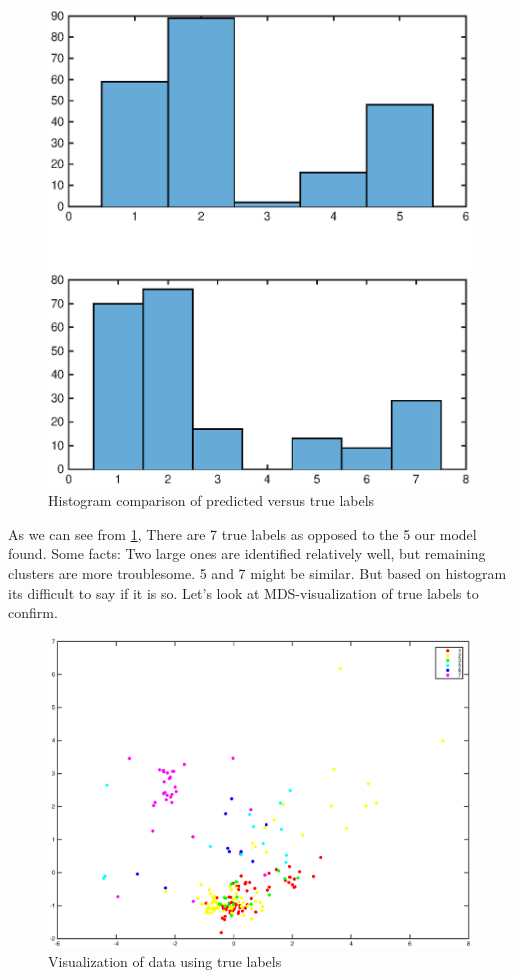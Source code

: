 \documentclass[a4paper]{article}
\begin{document}
\begin{figure}[H]
	\includegraphics[scale=0.67]{histogram_comparison.eps}
	\caption{Histogram comparison of predicted versus true labels}
	\label{histogram_comparison}
\end{figure}

\par
As we can see from \ref{histogram_comparison},  There are 7 true labels as opposed to the 5 our model found. Some facts: Two large ones are identified relatively well, but remaining clusters are more troublesome. 5 and 7 might be similar.  But based on histogram its difficult to say if it is so. Let's look at MDS-visualization of true labels to confirm.

\begin{figure}[H]
	\includegraphics[scale=0.67]{MDS_true_labels.eps}
	\caption{Visualization of data using true labels}
	\label{true_labels}
\end{figure}
\end{document}
